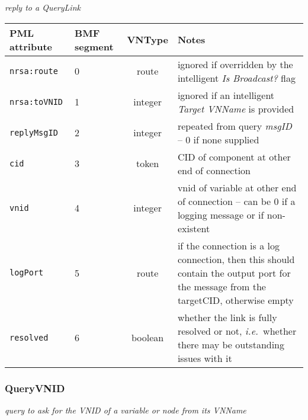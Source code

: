 \documentclass[pdftex,a4paper]{article}
\newcommand{\ie}{{\em i.e.\ }}
\newcommand{\XMLfont}[1]{{\tt \small #1}}
\begin{document}
{\em reply to a QueryLink}

\begin{table}[!h]
  \begin{center}
    \label{tab:ReplyLink}
    \begin{tabular}{|l|p{13mm}|c|p{60mm}|}
      \hline

      \textbf{PML attribute} & \textbf{BMF segment} & \textbf{VNType}
      & \textbf{Notes} \\\hline

      \XMLfont{nrsa:route} & 0 & route & ignored if overridden by the
      intelligent {\em Is Broadcast?} flag \\ \hline

      \XMLfont{nrsa:toVNID} & 1 & integer & ignored if an intelligent {\em
      Target VNName} is provided \\\hline

      \XMLfont{replyMsgID} & 2 & integer & repeated from query {\em
      msgID} -- 0 if none supplied \\\hline

      \XMLfont{cid} & 3 & token & CID of component at other end
      of connection \\\hline

      \XMLfont{vnid} & 4 & integer & vnid of variable at other
      end of connection -- can be 0 if a logging
      message or if non-existent\\\hline

      \XMLfont{logPort} & 5 & route & if the connection is a log
      connection, then this should contain the output port for the
      message from the targetCID, otherwise empty \\\hline

      \XMLfont{resolved} & 6 & boolean & whether the link is
      fully resolved or not, \ie whether there may be outstanding
      issues with it \\\hline

    \end{tabular}
  \end{center}
\end{table}


\clearpage

\subsubsection{QueryVNID}

{\em query to ask for the VNID of a variable or node from its VNName}
\end{document}
